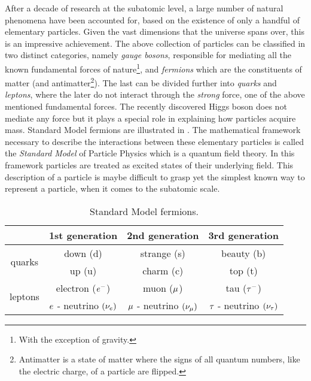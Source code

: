 After a decade of research at the subatomic level, a large number of natural phenomena have been accounted
for, based on the existence of only a handful of elementary particles. Given the vast dimensions that the
universe spans over, this is an impressive achievement. The above collection of particles can be classified
in two distinct categories, namely {\it gauge bosons}, responsible for mediating all the known fundamental
forces of nature\footnote{With the exception of gravity.}, and {\it fermions} which are the constituents
of matter
(and antimatter\footnote{Antimatter is a state of matter where the signs of all quantum numbers, like the electric charge, of a particle are flipped.}).
The last can be divided further into {\it quarks} and {\it leptons}, where the later do not interact through
the {\it strong} force, one of the above mentioned fundamental forces. The recently discovered Higgs
boson\cite{higgs-cms,higgs-atlas} does not mediate any force but it plays a special role in explaining how
particles acquire mass. Standard Model fermions are illustrated in .
The mathematical framework necessary to describe the interactions between these elementary particles is called
the \textit{Standard Model} of Particle Physics\cite{sm-glashow,sm-weinberg,sm-salam} which is a quantum field theory.
In this framework particles are treated as excited states of their underlying field. This description of a
particle is maybe difficult to grasp yet the simplest known way to represent a particle, when it comes to the subatomic scale.


\begin{table}[h!]
  \centering
 \begin{tabular}{cccc}
   \hline
                            &  1st generation                     &   2nd generation              &  3rd generation    \\
   \hline
   \multirow{2}{*}{quarks}  &  down (d)                           &   strange (s)                 &  beauty (b)        \\
                            &  up (u)                             &   charm (c)                   &  top (t)           \\
   \hline
   \multirow{2}{*}{leptons} &   electron ($e^-$)                  &   muon ($\mu$)               &  tau ($\tau^-$)     \\
                            &   $e$ - neutrino $(\nu_e)$  &  $\mu$ - neutrino $(\nu_\mu)$  &  $\tau$ - neutrino $(\nu_\tau)$  \\
   \hline
 \end{tabular}
 \caption{Standard Model fermions.}
 \label{quarksLeptons}
\end{table}

